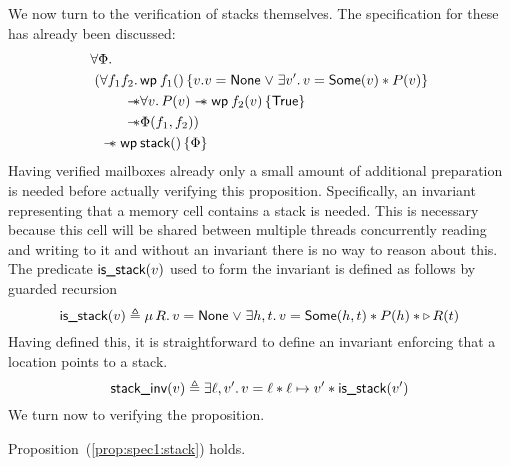 We now turn to the verification of stacks themselves. The
specification for these has already been discussed:
\begin{align}
  \forall \Phi.\qquad& \label{prop:spec1:stack}\\
  (\All f_1 f_2.&
        \wpre{f_1()}{v. v = \textlog{None} \mathrel{\vee} \Exists v'. v = \textlog{Some}(v) * P(v)} \nonumber\\
  \wand & \All v. P(v) \wand \wpre{f_2(v)}{\TRUE} \nonumber\\
  \wand & \Phi(f_1, f_2)) \nonumber\\
  \wand \wpre{&\textlog{stack}()}{\Phi} \nonumber
\end{align}
Having verified mailboxes already only a small amount of additional
preparation is needed before actually verifying this
proposition. Specifically, an invariant representing that a memory
cell contains a stack is needed. This is necessary because this cell
will be shared between multiple threads concurrently reading and
writing to it and without an invariant there is no way to reason about
this. The predicate $\textsf{is\_stack}(v)$ used to form the
invariant is defined as follows by guarded recursion
\[
  \textlog{is\_stack}(v) \triangleq
  \MU R. v = \textlog{None} \mathrel{\vee} \Exists h, t. v = \textlog{Some}(h, t) * P(h) * \later R(t)
\]
Having defined this, it is straightforward to define an invariant
enforcing that a location points to a stack.
\[
  \textlog{stack\_inv}(v) \triangleq
  \Exists \ell, v'. v = \ell * \ell \mapsto v' * \textlog{is\_stack}(v')
\]
We turn now to verifying the proposition.
\begin{thm}
  Proposition~(\ref{prop:spec1:stack}) holds.
\end{thm}
